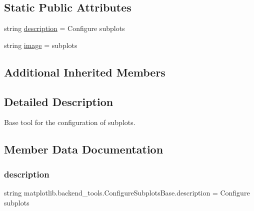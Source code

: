 \subsection*{Static Public Attributes}
\begin{DoxyCompactItemize}
\item 
string \hyperlink{classmatplotlib_1_1backend__tools_1_1ConfigureSubplotsBase_a33024d880c13a8d4aa7e249c02aba331}{description} = \textquotesingle{}Configure subplots\textquotesingle{}
\item 
string \hyperlink{classmatplotlib_1_1backend__tools_1_1ConfigureSubplotsBase_a12c9fa8b50a8b5bc9b95532b155ce0d3}{image} = \textquotesingle{}subplots\textquotesingle{}
\end{DoxyCompactItemize}
\subsection*{Additional Inherited Members}


\subsection{Detailed Description}
\begin{DoxyVerb}Base tool for the configuration of subplots.\end{DoxyVerb}
 

\subsection{Member Data Documentation}
\mbox{\label{classmatplotlib_1_1backend__tools_1_1ConfigureSubplotsBase_a33024d880c13a8d4aa7e249c02aba331}} 
\subsubsection{\texorpdfstring{description}{description}}
{\footnotesize\ttfamily string matplotlib.\+backend\+\_\+tools.\+Configure\+Subplots\+Base.\+description = \textquotesingle{}Configure subplots\textquotesingle{}\hspace{0.3cm}{\ttfamily [static]}}

